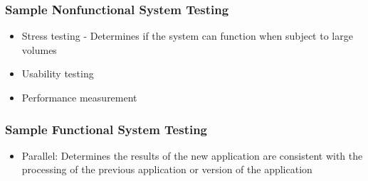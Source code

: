 \documentclass[t,12pt,numbers,fleqn]{beamer}
\begin{document}

\begin{frame}
\frametitle{Sample Nonfunctional System Testing}
\begin{itemize}
\item Stress testing - Determines if the system can function when subject to large volumes
\item Usability testing
\item Performance measurement
\end{itemize}
\end{frame}


\begin{frame}
\frametitle{Sample Functional System Testing}
\begin{itemize}
\item Parallel: Determines the results of the new application are consistent with the processing of the previous
application or version of the application
\end{itemize}
\end{frame}

\end{document}
